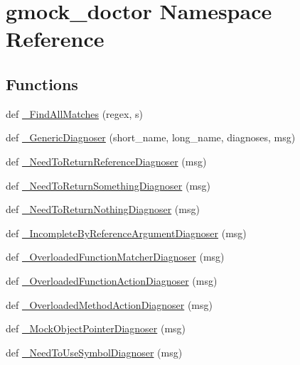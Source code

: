 \hypertarget{namespacegmock__doctor}{}\section{gmock\+\_\+doctor Namespace Reference}
\label{namespacegmock__doctor}
\subsection*{Functions}
\begin{DoxyCompactItemize}
\item 
def \mbox{\hyperlink{namespacegmock__doctor_af9f6b7d876afcfe52864f2b928f5e6ab}{\+\_\+\+Find\+All\+Matches}} (regex, s)
\item 
def \mbox{\hyperlink{namespacegmock__doctor_af5023d3e12d1f4a7171c6b035783de84}{\+\_\+\+Generic\+Diagnoser}} (short\+\_\+name, long\+\_\+name, diagnoses, msg)
\item 
def \mbox{\hyperlink{namespacegmock__doctor_aa922367471c9e517f839f98e0e3b0a1c}{\+\_\+\+Need\+To\+Return\+Reference\+Diagnoser}} (msg)
\item 
def \mbox{\hyperlink{namespacegmock__doctor_a1dc705b817ae15dbf51ebce10e47ed3f}{\+\_\+\+Need\+To\+Return\+Something\+Diagnoser}} (msg)
\item 
def \mbox{\hyperlink{namespacegmock__doctor_a1d30848b5afc8437c05c03f9d4878a0d}{\+\_\+\+Need\+To\+Return\+Nothing\+Diagnoser}} (msg)
\item 
def \mbox{\hyperlink{namespacegmock__doctor_a57b4c1486c344bd12e4138c588029c19}{\+\_\+\+Incomplete\+By\+Reference\+Argument\+Diagnoser}} (msg)
\item 
def \mbox{\hyperlink{namespacegmock__doctor_a82934d9b43f75ab1112a9436c1a31068}{\+\_\+\+Overloaded\+Function\+Matcher\+Diagnoser}} (msg)
\item 
def \mbox{\hyperlink{namespacegmock__doctor_a385cf8cf2ca6731bf66d721e2dbf89d1}{\+\_\+\+Overloaded\+Function\+Action\+Diagnoser}} (msg)
\item 
def \mbox{\hyperlink{namespacegmock__doctor_a830bf3bac2d58666d82a75dfa0865c42}{\+\_\+\+Overloaded\+Method\+Action\+Diagnoser}} (msg)
\item 
def \mbox{\hyperlink{namespacegmock__doctor_a91e21533e0bc183c40f5a9873158a94b}{\+\_\+\+Mock\+Object\+Pointer\+Diagnoser}} (msg)
\item 
def \mbox{\hyperlink{namespacegmock__doctor_a9ee9925aa81453f121d44e0ad8f1bbaf}{\+\_\+\+Need\+To\+Use\+Symbol\+Diagnoser}} (msg)
\item 

\end{DoxyCompactItemize}
